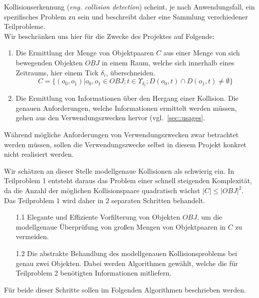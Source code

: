 Kollisionserkennung (\textit{eng. collision detection}) scheint, je nach Anwendungsfall, ein spezifisches Problem zu sein und beschreibt daher eine Sammlung verschiedener Teilprobleme.\\
Wir beschränken uns hier für die Zwecke des Projektes auf Folgende:
\begin{enumerate}
\item Die Ermittlung der Menge von Objektpaaren $C$ aus einer Menge von sich bewegenden Objekten $OBJ$ in einem Raum, welche sich innerhalb eines Zeitraums, hier einem Tick $\delta_i$, überschneiden.
$$C = \{(o_0, o_1) | o_0, o_1 \in OBJ; t\in \Upsilon_{\delta_i};  D(o_0, t) \cap D(o_1, t) \neq \emptyset\}$$
\item Die Ermittlung von Informationen über den Hergang einer Kollision.
Die genauen Anforderungen, welche Informationen ermittelt werden müssen, gehen aus den Verwendungszwecken hervor (vgl.~\ref{sec::usages}. 
\end{enumerate}

Während mögliche Anforderungen von Verwendungszwecken zwar betrachtet werden müssen, sollen die Verwendungszwecke selbst in diesem Projekt konkret nicht realisiert werden.

Wir schätzen an dieser Stelle modellgenaue Kollisionen als schwierig ein. In Teilproblem 1 entsteht daraus das Problem einer schnell steigenden Komplexität, da die Anzahl der möglichen Kollisionspaare quadratisch wächst $|C|\leq |OBJ|^2$.\\
Das Teilproblem 1 wird daher in 2 separaten Schritten behandelt.
\begin{itemize}
\item[1.1] Elegante und Effiziente Vorfilterung von Objekten $OBJ$, um die modellgenaue Überprüfung von großen Mengen von Objektpaaren in $C$ zu vermeiden.
\item[1.2] Die abstrakte Behandlung des modellgenauen Kollisionsproblems bei genau zwei Objekten. Dabei werden Algorithmen gewählt, welche die für Teilproblem 2 benötigten Informationen mitliefern.
\end{itemize}

Für beide dieser Schritte sollen im Folgenden Algorithmen beschrieben werden.\\
\\
